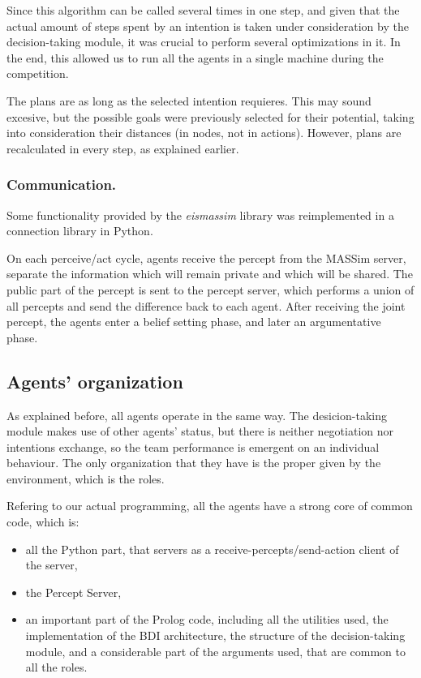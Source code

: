 \documentclass{llncs2e/llncs}
\begin{document}
    Since this algorithm can be called several times in one step, and given that the 
    actual amount of steps spent by an intention is taken under consideration by 
    the decision-taking module, it was crucial to perform several optimizations in 
    it. In the end, this allowed us to run all the agents in a single machine  
    during the competition.
    
    The plans are as long as the selected intention requieres. This may 
    sound excesive, but the possible goals were previously selected for their 
    potential, taking into consideration their distances (in nodes, not in 
    actions). However, plans are recalculated in every step, as explained earlier.    

\subsubsection{Communication.}

    Some functionality provided by the \textit{eismassim} library was
    reimplemented in a connection library in Python.

    On each perceive/act cycle, agents receive the percept from the MASSim server, 
    separate the information which will remain private and which will be shared. 
    The public part of the percept is sent to the percept server, which performs a 
    union of all percepts and send the difference back to each agent. After 
    receiving the joint percept, the agents enter a belief setting phase, and 
    later an argumentative phase.
    

\subsection{Agents' organization}

    As explained before, all agents operate in the same way. The desicion-taking
    module makes use of other agents' status, but there is neither negotiation nor 
    intentions exchange, so the team performance is emergent on an individual behaviour. 
    The only organization that they have is the proper given by the environment, 
    which is the roles.
    
    Refering to our actual programming, all the agents have a strong core of common
    code, which is:
    
    \begin{itemize}
    \item all the Python part, that servers as a receive-percepts/send-action client 
    of the server,
    
    \item the Percept Server,
    
    \item an important part of the Prolog code, including all the utilities used, the
    implementation of the BDI architecture, the structure of the 
    decision-taking module, and a considerable part of the arguments used, that
    are common to all the roles.
    \end{itemize}
    
\end{document}
